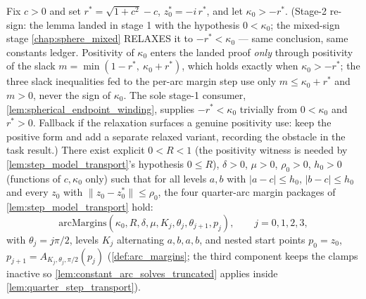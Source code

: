 \begin{lemma}
  \label{lem:step_model_margins}
  Fix $c>0$ and set $r^\ast=\sqrt{1+c^2}-c$, $z_0^\ast=-i\,r^\ast$, and let
  $\kappa_0>-r^\ast$. (Stage-2 re-sign: the lemma landed in stage 1 with the
  hypothesis $0<\kappa_0$; the mixed-sign stage \cref{chap:sphere_mixed} RELAXES it
  to $-r^\ast<\kappa_0$ — same conclusion, same constants ledger. Positivity of
  $\kappa_0$ enters the landed proof \emph{only} through positivity of the slack
  $m=\min(1-r^\ast,\ \kappa_0+r^\ast)$, which holds exactly when
  $\kappa_0>-r^\ast$; the three slack inequalities fed to the per-arc margin
  step use only $m\le\kappa_0+r^\ast$ and $m>0$, never the sign of $\kappa_0$.
  The sole stage-1 consumer, \cref{lem:spherical_endpoint_winding}, supplies
  $-r^\ast<\kappa_0$ trivially from $0<\kappa_0$ and $r^\ast>0$. Fallback if the
  relaxation surfaces a genuine positivity use: keep the positive form and add a
  separate relaxed variant, recording the obstacle in the task result.)
  There exist explicit $0<R<1$ (the positivity witness is needed
  by \cref{lem:step_model_transport}'s hypothesis $0\le R$), $\delta>0$, $\mu>0$,
  $\rho_0>0$, $h_0>0$ (functions of $c,\kappa_0$ only) such that for all levels $a,b$
  with $|a-c|\le h_0$, $|b-c|\le h_0$ and every $z_0$ with $\|z_0-z_0^\ast\|\le\rho_0$,
  the four quarter-arc margin packages of \cref{lem:step_model_transport} hold:
  \[
    \mathrm{arcMargins}(\kappa_0,R,\delta,\mu,K_j,\theta_j,\theta_{j+1},p_j),
    \qquad j=0,1,2,3,
  \]
  with $\theta_j=j\pi/2$, levels $K_j$ alternating $a,b,a,b$, and nested start points
  $p_0=z_0$, $p_{j+1}=A_{K_j,\theta_j,\pi/2}(p_j)$ (\cref{def:arc_margins}; the third
  component keeps the clamps inactive so \cref{lem:constant_arc_solves_truncated}
  applies inside \cref{lem:quarter_step_transport}).
\end{lemma}

